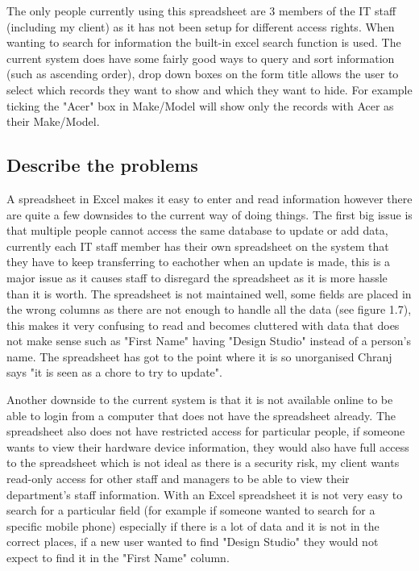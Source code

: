 The only people currently using this spreadsheet are 3 members of the IT staff (including my client) as it has not been setup for different access rights. When wanting to search for information the built-in excel search function is used. The current system does have some fairly good ways to query and sort information (such as ascending order), drop down boxes on the form title allows the user to select which records they want to show and which they want to hide. For example ticking the "Acer" box in Make/Model will show only the records with Acer as their Make/Model. 

\subsection{Describe the problems}

A spreadsheet in Excel makes it easy to enter and read information however there are quite a few downsides to the current way of doing things. The first  big issue is that multiple people cannot access the same database to update or add data, currently each IT staff member has their own spreadsheet on the system that they have to keep transferring to eachother when an update is made, this is a major issue as it causes staff to disregard the spreadsheet as it is more hassle than it is worth. The spreadsheet is not maintained well, some fields are placed in the wrong columns as there are not enough to handle all the data (see figure 1.7), this makes it very confusing to read and becomes cluttered with data that does not make sense such as "First Name" having "Design Studio" instead of a person's name. The spreadsheet has got to the point where it is so unorganised Chranj says "it is seen as a chore to try to update". 

Another downside to the current system is that it is not available online to be able to login from a computer that does not have the spreadsheet already. The spreadsheet also does not have restricted access for particular people, if someone wants to view their hardware device information, they would also have full access to the spreadsheet which is not ideal as there is a security risk, my client wants read-only access for other staff and managers to be able to view their department's staff information. With an Excel spreadsheet it is not very easy to search for a particular field (for example if someone wanted to search for a specific mobile phone) especially if there is a lot of data and it is not in the correct places, if a new user wanted to find "Design Studio" they would not expect to find it in the "First Name" column.

